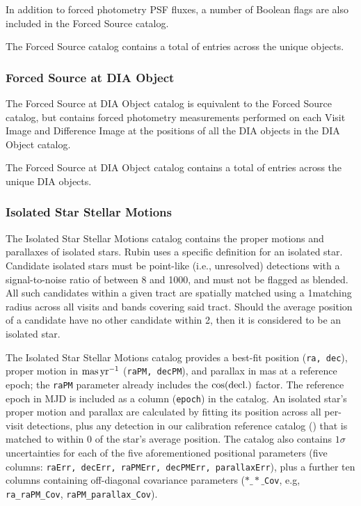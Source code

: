 In addition to forced photometry \gls{PSF} fluxes, a number of Boolean flags are also included in the Forced Source catalog.

The Forced \gls{Source} catalog contains a total of \nforcedsources entries across the \nobjects unique objects.

\subsubsection{Forced Source at DIA Object}
\label{sssec:ForcedSourceAtDIAObject}
The Forced Source at DIA Object catalog is equivalent to the Forced Source catalog, but contains \gls{forced photometry} measurements performed on each Visit Image and Difference Image at the positions of all the DIA objects in the DIA Object catalog.

The Forced Source at \gls{DIA} Object catalog contains a total of \ndiaforcedsources entries across the \ndiaobjects unique \gls{DIA} objects.


\subsubsection{Isolated Star Stellar Motions}
\label{sssec:isolatedstarstellarmotions}
The Isolated Star Stellar Motions catalog contains the proper motions and parallaxes of isolated stars.
Rubin uses a specific definition for an isolated star.
Candidate isolated stars must be point-like (i.e., unresolved) detections with a signal-to-noise ratio of between 8 and 1000, and must not be flagged as blended.
All such candidates within a given \gls{tract} are spatially matched using a 1\arcsec matching radius across all visits and bands covering said \gls{tract}.
Should the average position of a candidate have no other candidate within 2\arcsec, then it is considered to be an isolated star.

The Isolated Star Stellar Motions catalog provides a best-fit position (\texttt{ra, dec}), proper motion in $\rm mas\,yr^{-1}$ (\texttt{raPM, decPM}), and parallax in mas at a reference \gls{epoch}; the \texttt{raPM} parameter already includes the $\cos(\rm decl.)$ factor.
The reference epoch in \gls{MJD} is included as a column (\texttt{epoch}) in the catalog.
An isolated star's proper motion and parallax are calculated by fitting its position across all per-visit detections, plus any detection in our \gls{calibration} reference catalog () that is matched to within 0 of the star's average position.
The catalog also contains $1\sigma$ uncertainties for each of the five aforementioned positional parameters (five columns: \texttt{raErr, decErr, raPMErr, decPMErr, parallaxErr}), plus a further ten columns containing off-diagonal covariance parameters (\texttt{$\ast\_\ast\_$Cov}, e.g, \texttt{ra\_raPM\_Cov}, \texttt{raPM\_parallax\_Cov}).

